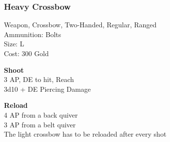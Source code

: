 \subsubsection{Heavy Crossbow}\label{weapon:heavyCrossbow}
Weapon, Crossbow, Two-Handed, Regular, Ranged\\
Ammunition: Bolts\\
Size: L\\
Cost: 300 Gold

\textbf{Shoot} \\
3 AP, DE to hit,  Reach\\
3d10 + \texttimes DE Piercing Damage

\textbf{Reload} \\
4 AP from a back quiver\\
3 AP from a belt quiver\\
The light crossbow has to be reloaded after every shot

